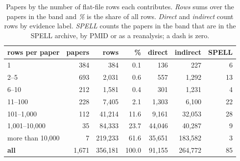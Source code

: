 \begin{table}[H]\centering
\footnotesize
\caption[]{Papers by the number of flat-file rows each contributes. \emph{Rows}
sums over the papers in the band and \emph{\%} is the share of all rows.
\emph{Direct} and \emph{indirect} count rows by evidence label. \emph{SPELL}
counts the papers in the band that are in the SPELL archive, by PMID or as a
reanalysis; a dash is zero.}\label{tab:sizes}
\begin{tabular}{lrrrrrr}
\toprule
rows per paper & papers & rows & \% & direct & indirect & SPELL \\
\midrule
1 & 384 & 384 & 0.1 & 136 & 227 & 6 \\
2--5 & 693 & 2,031 & 0.6 & 557 & 1,292 & 13 \\
6--10 & 212 & 1,581 & 0.4 & 301 & 1,231 & 4 \\
11--100 & 228 & 7,405 & 2.1 & 1,303 & 6,100 & 22 \\
101--1,000 & 112 & 41,214 & 11.6 & 9,161 & 32,053 & 28 \\
1,001--10,000 & 35 & 84,333 & 23.7 & 44,046 & 40,287 & 9 \\
more than 10,000 & 7 & 219,233 & 61.6 & 35,651 & 183,582 & 3 \\
\midrule
\textbf{all} & 1,671 & 356,181 & 100.0 & 91,155 & 264,772 & 85 \\
\bottomrule
\end{tabular}
\end{table}
